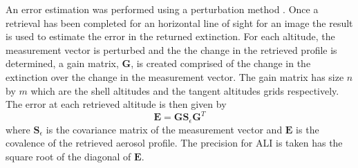 \documentclass[12pt]{article}
\begin{document}
An error estimation was performed using a perturbation method \citep{Bourassa2012b}. Once a retrieval has been completed for an horizontal line of sight for an image the result is used to estimate the error in the returned extinction. For each altitude, the measurement vector is perturbed and the the change in the retrieved profile is determined, a gain matrix, $\mathbf{G}$, is created comprised of the change in the extinction over the change in the measurement vector. The gain matrix has size $n$ by $m$ which are the shell altitudes and the tangent altitudes grids respectively. The error at each retrieved altitude is then given by
\begin{equation}
    \mathbf{E} = \mathbf{G}\mathbf{S}_{\epsilon}\mathbf{G}^{T}
\end{equation}
where $\mathbf{S}_{\epsilon}$ is the covariance matrix of the measurement vector and $\mathbf{E}$ is the covalence of the retrieved aerosol profile. The precision for ALI is taken has the square root of the diagonal of $\mathbf{E}$.
\end{document}
